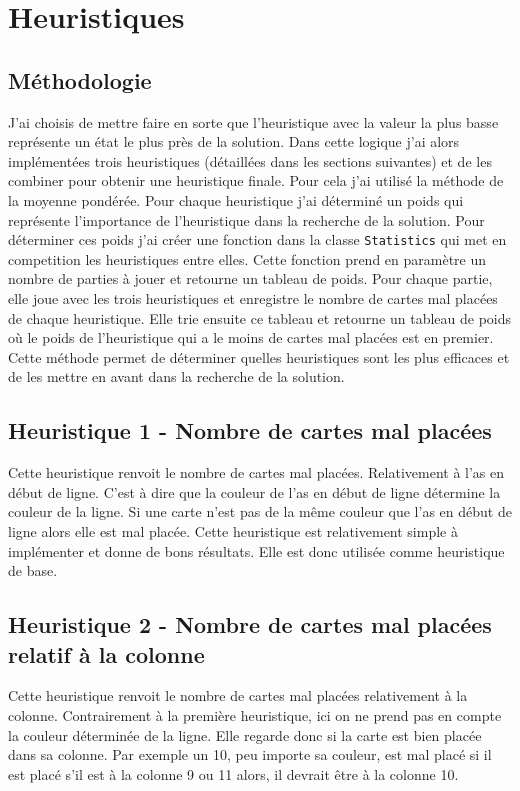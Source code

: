 \chapter{Heuristiques}

\section{Méthodologie}
J'ai choisis de mettre faire en sorte que l'heuristique avec la valeur la plus basse représente un état le plus près de la solution. Dans cette logique j'ai alors implémentées trois heuristiques (détaillées dans les sections suivantes) et de les combiner pour obtenir une heuristique finale. Pour cela j'ai utilisé la méthode de la moyenne pondérée. Pour chaque heuristique j'ai déterminé un poids qui représente l'importance de l'heuristique dans la recherche de la solution. Pour déterminer ces poids j'ai créer une fonction dans la classe \texttt{Statistics} qui met en competition les heuristiques entre elles. Cette fonction prend en paramètre un nombre de parties à jouer et retourne un tableau de poids. Pour chaque partie, elle joue avec les trois heuristiques et enregistre le nombre de cartes mal placées de chaque heuristique. Elle trie ensuite ce tableau et retourne un tableau de poids où le poids de l'heuristique qui a le moins de cartes mal placées est en premier. Cette méthode permet de déterminer quelles heuristiques sont les plus efficaces et de les mettre en avant dans la recherche de la solution.

\section{Heuristique 1 - Nombre de cartes mal placées}
Cette heuristique renvoit le nombre de cartes mal placées. Relativement à l'as en début de ligne. C'est à dire que la couleur de l'as en début de ligne détermine la couleur de la ligne. Si une carte n'est pas de la même couleur que l'as en début de ligne alors elle est mal placée. Cette heuristique est relativement simple à implémenter et donne de bons résultats. Elle est donc utilisée comme heuristique de base.

\pagebreak

\section{Heuristique 2 - Nombre de cartes mal placées relatif à la colonne}
Cette heuristique renvoit le nombre de cartes mal placées relativement à la colonne. Contrairement à la première heuristique, ici on ne prend pas en compte la couleur déterminée de la ligne. Elle regarde donc si la carte est bien placée dans sa colonne. Par exemple un 10, peu importe sa couleur, est mal placé si il est placé s'il est à la colonne 9 ou 11 alors, il devrait être à la colonne 10.

